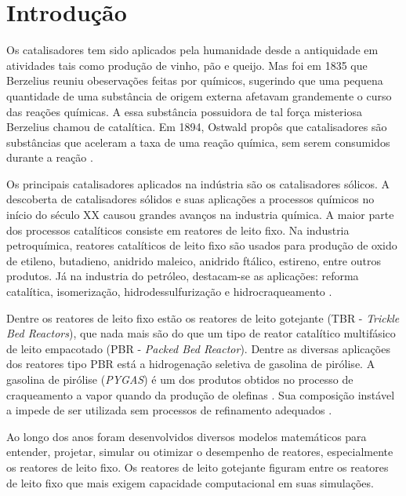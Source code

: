 %
% 
%
\chapter{Introdução} \label{chap:introducao}

Os catalisadores tem sido aplicados pela humanidade desde a antiquidade
em atividades tais como produção de vinho, pão e queijo. Mas foi em 1835 que
Berzelius reuniu obeservações feitas por químicos, sugerindo que uma pequena
quantidade de uma substância de origem externa afetavam grandemente o curso das
reações químicas. A essa substância possuidora de tal força misteriosa Berzelius
chamou de catalítica. Em 1894, Ostwald propôs que catalisadores são substâncias
que aceleram a taxa de uma reação química, sem serem consumidos durante a reação
\cite{Oyama1988}.

Os principais catalisadores aplicados na indústria são os catalisadores
sólicos. A descoberta de catalisadores sólidos e suas aplicações a processos
químicos no início do século XX causou grandes avanços na industria química. A
maior parte dos processos catalíticos consiste em reatores de leito fixo. Na
industria petroquímica, reatores catalíticos de leito fixo são usados para
produção de oxido de etileno, butadieno, anidrido maleico, anidrido ftálico,
estireno, entre outros produtos. Já na industria do petróleo, destacam-se as
aplicações: reforma catalítica, isomerização, hidrodessulfurização e
hidrocraqueamento \cite{Froment2011}.

Dentre os reatores de leito fixo estão os reatores de leito gotejante
(TBR - \emph{Trickle Bed Reactors}), que nada mais são do que um tipo de reator
catalítico multifásico de leito empacotado (PBR - \emph{Packed Bed Reactor}).
Dentre as diversas aplicações dos reatores tipo PBR está a hidrogenação
seletiva de gasolina de pirólise. A gasolina de pirólise (\emph{PYGAS}) é um dos
produtos obtidos no processo de craqueamento a vapor quando da produção de
olefinas \cite{Cheng1986}. Sua composição instável a impede de ser utilizada sem
processos de refinamento adequados \cite{Derrien1986}.

Ao longo dos anos foram desenvolvidos diversos modelos matemáticos para
entender, projetar, simular ou otimizar o desempenho de reatores, especialmente
os reatores de leito fixo. Os reatores de leito gotejante figuram entre os
reatores de leito fixo que mais exigem capacidade computacional em suas
simulações. 

